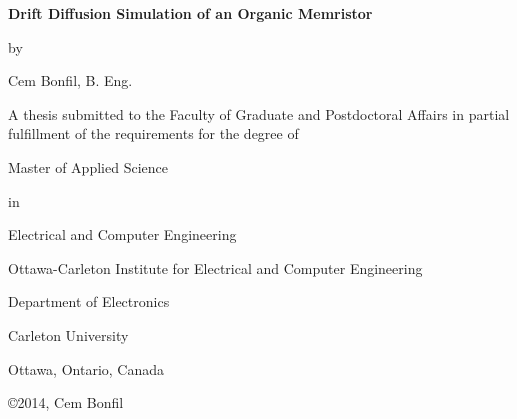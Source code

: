 \documentclass[11pt, a4paper, oneside]{Thesis} %
\begin{document}
\begin{titlepage}
\begin{center}
\LARGE
\textbf{Drift Diffusion Simulation of an Organic Memristor}
\vspace{6 mm}
\large 
\begin{center}
by 
\vspace{6 mm}
\end{center}
\large  
Cem Bonfil, B. Eng.
\end{center}



\large  
\begin{center}
A thesis submitted to the
Faculty of Graduate and Postdoctoral Affairs
in partial fulfillment of
the requirements for the degree of
\end{center}

\vspace{6 mm}
\large  
\begin{center}
Master of Applied Science
\end{center}
\large  
\begin{center}
in
\end{center}
\large  
\begin{center}
Electrical and Computer Engineering
\end{center}

\vspace{6 mm}

\large  
\begin{center}
Ottawa-Carleton Institute for Electrical and Computer Engineering
\end{center}

\large  
\begin{center}
Department of Electronics
\end{center}
\large  
\begin{center}
Carleton University
\end{center}
\large  
\begin{center}
Ottawa, Ontario, Canada
\end{center}

\vspace{6 mm}
\large  
\begin{center}
\copyright 2014, Cem Bonfil
\end{center}

\end{titlepage}



\newpage %
\end{document}
